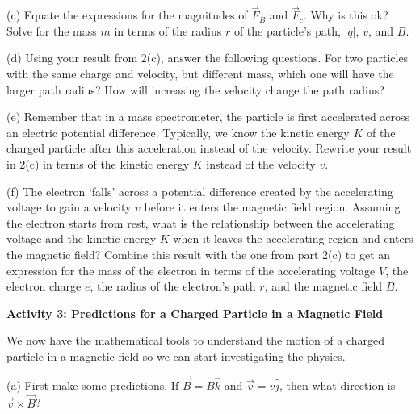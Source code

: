 \newpage

(c) Equate the expressions for the magnitudes of $\vec F_B$ and
$\vec F_c$. Why is this ok?
Solve for the mass $m$ in terms of the radius $r$ of the particle's path,
$|q|$, $v$, and $B$.
\vspace{35mm}


(d) Using your result from 2(c), answer the following questions.
For two particles with the same charge and velocity, but different mass, which one will have the larger path radius?
How will increasing the velocity change the path radius?
\vspace{30mm}

(e) Remember that in a mass spectrometer, the particle is first accelerated
across an electric potential difference.
Typically, we know the kinetic energy $K$ of the charged particle after this
acceleration instead of the velocity.
Rewrite your result in 2(c) in terms of the kinetic energy $K$ instead of the
velocity $v$.
\vspace{30mm}

(f) The electron `falls' across a potential difference created by the accelerating voltage
to gain a velocity $v$ before it enters the magnetic field region.
Assuming the electron starts from rest, what is the relationship between the accelerating
voltage and the kinetic energy $K$ when it leaves the accelerating region and
enters the magnetic field? 
Combine this result with the one from part 2(c) to get an expression for 
the mass of the electron in terms of the accelerating voltage $V$, the
electron charge $e$, the radius of the electron's path $r$, and 
the magnetic field $B$.
\vspace{30mm}


\textbf{Activity 3: Predictions for a Charged Particle in a Magnetic Field}

We now have the mathematical tools to understand the motion of a charged
particle in a magnetic field so we can start  investigating the physics.

(a) First make some predictions.
If $\vec B = B \hat k$ and $\vec v = v \hat j$, then what direction is
$\vec v \times \vec B$?
\vspace{15mm}


